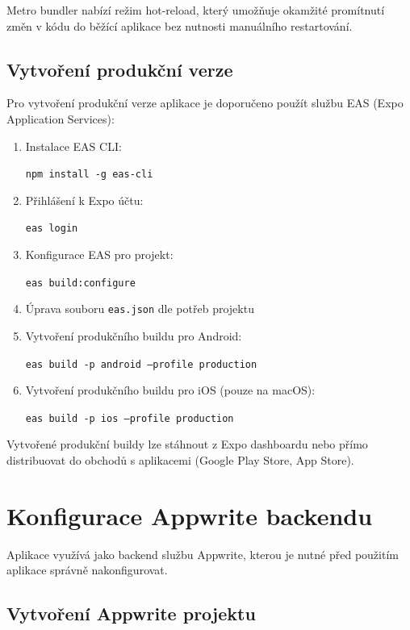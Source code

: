 \documentclass[czech, bp, kiv, he, iso690numb, pdf]{fasthesis}
\begin{document}
    Metro bundler nabízí režim hot-reload, který umožňuje okamžité promítnutí změn v kódu do běžící aplikace bez nutnosti manuálního restartování.

    \subsection{Vytvoření produkční verze}
    \label{subsec:production-build}

    Pro vytvoření produkční verze aplikace je doporučeno použít službu EAS (Expo Application Services):

    \begin{enumerate}
        \item Instalace EAS CLI:

        \texttt{npm install -g eas-cli}

        \item Přihlášení k Expo účtu:

        \texttt{eas login}

        \item Konfigurace EAS pro projekt:

        \texttt{eas build:configure}

        \item Úprava souboru \texttt{eas.json} dle potřeb projektu
        \item Vytvoření produkčního buildu pro Android:

        \texttt{eas build -p android --profile production}

        \item Vytvoření produkčního buildu pro iOS (pouze na macOS):

        \texttt{eas build -p ios --profile production}
    \end{enumerate}

    Vytvořené produkční buildy lze stáhnout z Expo dashboardu nebo přímo distribuovat do obchodů s aplikacemi (Google Play Store, App Store).

    \section{Konfigurace Appwrite backendu}
    \label{sec:appwrite-config}

    Aplikace využívá jako backend službu Appwrite, kterou je nutné před použitím aplikace správně nakonfigurovat.

    \subsection{Vytvoření Appwrite projektu}
    \label{subsec:appwrite-project}
\end{document}
